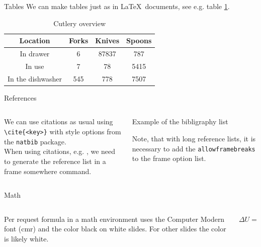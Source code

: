 \documentclass[aspectratio=169]{beamer}
\begin{document}
\begin{frame}{Tables}
\centering
We can make tables just as in \LaTeX\ documents, see e.g. table \ref{tab:cutlery}.
\begin{table}[]
\centering
\begin{tabular}{| c | c | c | c |}
\hline
 \textbf{Location} & \textbf{Forks} & \textbf{Knives} & \textbf{Spoons} \\ 
 \hline
 In drawer & 6 & 87837 & 787 \\ 
  \hline
 In use & 7 & 78 & 5415 \\
  \hline
 In the dishwasher & 545 & 778 & 7507 \\
 \hline
\end{tabular}
\caption{Cutlery overview}
\label{tab:cutlery}
\end{table}   
\end{frame}

\begin{frame}[fragile]{References}
\begin{columns}
\begin{column}{0.5\textwidth}
We can use citations as usual using \verb=\cite{<key>}= with style options from the \verb=natbib= package.\\
\vspace{0.5em}
When using citations, e.g. \cite{tantau2004user, mertz2005beamer}, we need to generate the reference list in a frame somewhere \verb== command.
\end{column}
\begin{column}{0.45\textwidth}
Example of the bibligraphy list\\
\vspace{1em}

\vspace{1em}
Note, that with long reference lists, it is necessary to add the \verb=allowframebreaks= to the frame option list.
\end{column}
\end{columns}
\end{frame}

\begin{frame}[fragile]{Math}
    \begin{columns}
    \begin{column}{0.45\textwidth}
       Per request formula in a math environment uses the Computer Modern font (cmr) and the color black on white slides. For other slides the color is likely white. 
    \end{column}
    \begin{column}{0.45\textwidth}
        \Huge
        \centering
        \begin{math}
            \Delta U = Q - W
        \end{math}
    \end{column}
    \end{columns}
    \end{frame}
\end{document}
